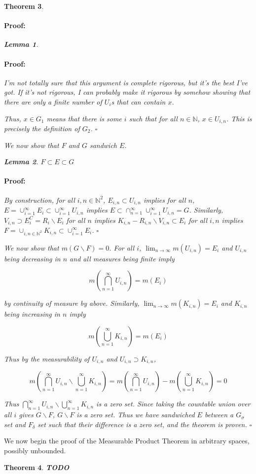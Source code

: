 \documentclass{article}
\newenvironment{proof}{\paragraph{Proof:}}{\hfill$\square$}
\newtheorem{theorem}{Theorem}
\newtheorem{lemma}[theorem]{Lemma}
\newcommand{\N}{\mathbb{N}}
\begin{document}
\begin{theorem}
\begin{proof}
\begin{lemma}
\begin{proof}
I'm not totally sure that this argument is complete rigorous, but it's the best I've got. If it's not rigorous, I can probably make it rigorous by somehow showing that there are only a finite number of $U_i$s that can contain $x$.

Thus, $x \in G_1$ means that there is some $i$ such that for all $n \in \N$, $x \in U_{i, n}$. This is precisely the definition of $G_2$.
\end{proof}
\end{lemma}

We now show that $F$ and $G$ sandwich $E$.

\begin{lemma}
$F \subset E \subset G$
\begin{proof}
By construction, for all $i, n \in \N^2$, $E_{i, n} \subset U_{i, n}$ implies for all $n$, $E = \cup_{i=1}^\infty E_{i} \subset \cup_{i=1}^\infty U_{i, n}$ implies $E \subset \cap_{n=1}^\infty \cup_{i=1}^\infty U_{i, n} = G$. Similarly, $V_{i, n} \supset E_i^C = R_i \backslash E_i$ for all $n$ implies $K_{i, n} - R_{i, n} \backslash V_{i, n} \subset E_i$ for all $i, n$ implies $F = \cup_{i,n \in \N^2} K_{i, n} \subset \cup_{i=1}^\infty E_i$.
\end{proof}
\end{lemma}

We now show that $m(G \backslash F) = 0$. For all $i$, $\lim_{n \rightarrow \infty} m(U_{i, n}) = E_i$ and $U_{i, n}$ being decreasing in $n$ and all measures being finite imply

\[
m(\bigcap_{n=1}^\infty U_{i, n}) = m(E_i)
\]

by continuity of measure by above. Similarly, $\lim_{n \rightarrow \infty} m(K_{i, n}) = E_i$ and $K_{i, n}$ being increasing in $n$ imply

\[
m(\bigcup_{n=1}^\infty K_{i, n}) = m(E_i)
\]

Thus by the measurability of $U_{i, n}$ and $U_{i, n} \supset K_{i, n}$,

\[
m(\bigcap_{n=1}^\infty U_{i, n} \backslash \bigcup_{n=1}^\infty K_{i, n})
= m(\bigcap_{n=1}^\infty U_{i, n}) - m(\bigcup_{n=1}^\infty K_{i, n}) = 0
\]

Thus $\bigcap_{n=1}^\infty U_{i, n} \backslash \bigcup_{n=1}^\infty K_{i, n}$ is a zero set. Since taking the countable union over all $i$ gives $G \backslash F$, $G \backslash F$ is a zero set. Thus we have sandwiched $E$ between a $G_\sigma$ set and $F_\delta$ set such that their difference is a zero set, and the theorem is proven.
\end{proof}
\end{theorem}

We now begin the proof of the Measurable Product Theorem in arbitrary spaces, possibly unbounded.

\begin{theorem}
\textbf{TODO}
\end{theorem}
\end{document}
